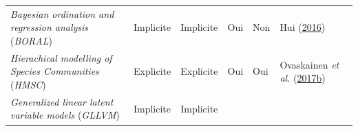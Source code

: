\documentclass[12pt,]{article}
\begin{document}
{\begin{longtable}[]{@{}llllll@{}}
\begin{minipage}[t]{0.35\columnwidth}
\emph{Bayesian ordination and regression analysis} (\emph{BORAL})\strut
\end{minipage} & \begin{minipage}[t]{0.10\columnwidth}\raggedright
Implicite\strut
\end{minipage} & \begin{minipage}[t]{0.10\columnwidth}\raggedright
Implicite\strut
\end{minipage} & \begin{minipage}[t]{0.12\columnwidth}\raggedright
Oui\strut
\end{minipage} & \begin{minipage}[t]{0.07\columnwidth}\raggedright
Non\strut
\end{minipage} & \begin{minipage}[t]{0.10\columnwidth}\raggedright
Hui (\protect\hyperlink{ref-Hui_2016}{2016})\strut
\end{minipage}\tabularnewline
\begin{minipage}[t]{0.35\columnwidth}\raggedright
\emph{Hierachical modelling of Species Communities} (\emph{HMSC})\strut
\end{minipage} & \begin{minipage}[t]{0.10\columnwidth}\raggedright
Explicite\strut
\end{minipage} & \begin{minipage}[t]{0.10\columnwidth}\raggedright
Explicite\strut
\end{minipage} & \begin{minipage}[t]{0.12\columnwidth}\raggedright
Oui\strut
\end{minipage} & \begin{minipage}[t]{0.07\columnwidth}\raggedright
Oui\strut
\end{minipage} & \begin{minipage}[t]{0.10\columnwidth}\raggedright
Ovaskainen \emph{et al.}
(\protect\hyperlink{ref-Ovaskainen_2017a}{2017}\protect\hyperlink{ref-Ovaskainen_2017a}{b})\strut
\end{minipage}\tabularnewline
\begin{minipage}[t]{0.35\columnwidth}\raggedright
\emph{Generalized linear latent variable models} (\emph{GLLVM})\strut
\end{minipage} & \begin{minipage}[t]{0.10\columnwidth}\raggedright
Implicite\strut
\end{minipage} & \begin{minipage}[t]{0.10\columnwidth}\raggedright
Implicite\strut

\end{minipage}
\end{longtable}}
\end{document}

